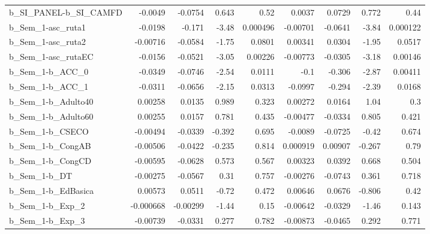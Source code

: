 \begin{tabular}{lrrrrrrrr}
b\_SI\_PANEL-b\_SI\_CAMFD      &     -0.0049 &      -0.0754 &     0.643 &     0.52 &     0.0037 &      0.0729 &        0.772 &          0.44 \\
b\_Sem\_1-asc\_ruta1          &     -0.0198 &       -0.171 &     -3.48 & 0.000496 &   -0.00701 &     -0.0641 &        -3.84 &      0.000122 \\
b\_Sem\_1-asc\_ruta2          &    -0.00716 &      -0.0584 &     -1.75 &   0.0801 &    0.00341 &      0.0304 &        -1.95 &        0.0517 \\
b\_Sem\_1-asc\_rutaEC         &     -0.0156 &      -0.0521 &     -3.05 &  0.00226 &   -0.00773 &     -0.0305 &        -3.18 &       0.00146 \\
b\_Sem\_1-b\_ACC\_0            &     -0.0349 &      -0.0746 &     -2.54 &   0.0111 &       -0.1 &      -0.306 &        -2.87 &       0.00411 \\
b\_Sem\_1-b\_ACC\_1            &     -0.0311 &      -0.0656 &     -2.15 &   0.0313 &    -0.0997 &      -0.294 &        -2.39 &        0.0168 \\
b\_Sem\_1-b\_Adulto40         &     0.00258 &       0.0135 &     0.989 &    0.323 &    0.00272 &      0.0164 &         1.04 &           0.3 \\
b\_Sem\_1-b\_Adulto60         &     0.00255 &       0.0157 &     0.781 &    0.435 &   -0.00477 &     -0.0334 &        0.805 &         0.421 \\
b\_Sem\_1-b\_CSECO            &    -0.00494 &      -0.0339 &    -0.392 &    0.695 &    -0.0089 &     -0.0725 &        -0.42 &         0.674 \\
b\_Sem\_1-b\_CongAB           &    -0.00506 &      -0.0422 &    -0.235 &    0.814 &   0.000919 &     0.00907 &       -0.267 &          0.79 \\
b\_Sem\_1-b\_CongCD           &    -0.00595 &      -0.0628 &     0.573 &    0.567 &    0.00323 &      0.0392 &        0.668 &         0.504 \\
b\_Sem\_1-b\_DT               &    -0.00275 &      -0.0567 &      0.31 &    0.757 &   -0.00276 &     -0.0743 &        0.361 &         0.718 \\
b\_Sem\_1-b\_EdBasica         &     0.00573 &       0.0511 &     -0.72 &    0.472 &    0.00646 &      0.0676 &       -0.806 &          0.42 \\
b\_Sem\_1-b\_Exp\_2            &   -0.000668 &     -0.00299 &     -1.44 &     0.15 &   -0.00642 &     -0.0329 &        -1.46 &         0.143 \\
b\_Sem\_1-b\_Exp\_3            &    -0.00739 &      -0.0331 &     0.277 &    0.782 &   -0.00873 &     -0.0465 &        0.292 &         0.771 \\

\end{tabular}
